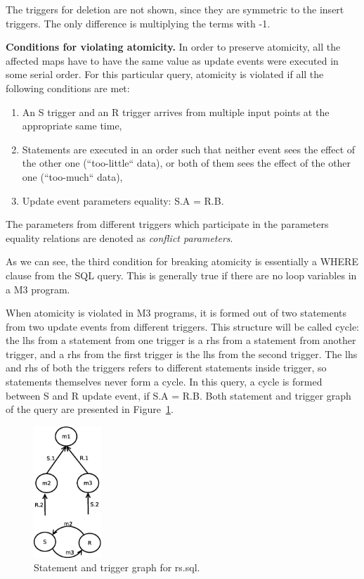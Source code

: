 \documentclass{sig-semester}
\begin{document}
The triggers for deletion are not shown, since they are symmetric to the insert triggers. The only difference is multiplying the terms with -1.

\textbf{Conditions for violating atomicity.} In order to preserve atomicity, all the affected maps have to have the same value as update events were executed in some serial order. For this particular query, atomicity is violated if all the following conditions are met:
\begin{enumerate}[(1)]
 \item An S trigger and an R trigger arrives from multiple input points at the appropriate same time,
 \item Statements are executed in an order such that neither event sees the effect of the other one (``too-little`` data), or both of them sees the effect of the other one (``too-much`` data),
 \item Update event parameters equality: S.A = R.B.
\end{enumerate}

The parameters from different triggers which participate in the parameters equality relations are denoted as \textit{conflict parameters}.

As we can see, the third condition for breaking atomicity is essentially a WHERE clause from the SQL query. This is generally true if there are no loop variables in a M3 program.

When atomicity is violated in M3 programs, it is formed out of two statements from two update events from different triggers. This structure will be called cycle: the lhs from a statement from one trigger is a rhs from a statement from another trigger, and a rhs from the first trigger is the lhs from the second trigger. The lhs and rhs of both the triggers refers to different statements inside trigger, so statements themselves never form a cycle. In this query, a cycle is formed between S and R update event, if S.A = R.B. Both statement and trigger graph of the query are presented in Figure~\ref{fig:rs}.

\begin{figure}[!t]
\centering
\includegraphics[width=1in]{rs.eps}
\vspace{-3mm}
\caption{Statement and trigger graph for rs.sql.}
\label{fig:rs}
\vspace{-2mm}
\end{figure}
\end{document}
